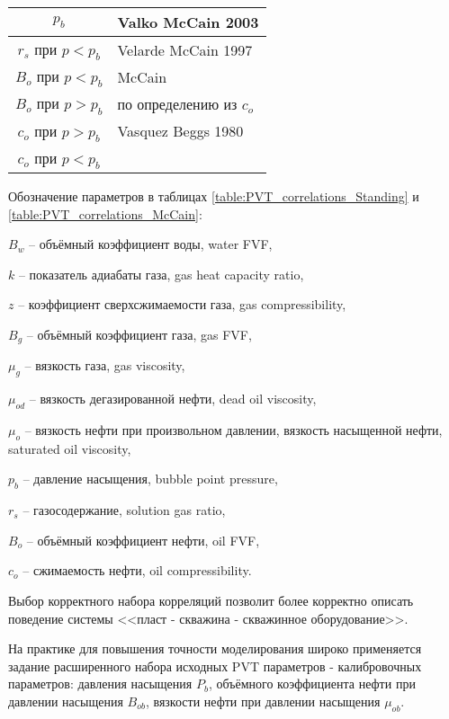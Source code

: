 \begin{table}[]
\begin{tabular}{|c|l|}
		$p_{b}$     &  Valko McCain 2003 \cite{Valko_McCain_2003}    \\ \hline
		
		$r_{s}$ при $p<p_b$      &   Velarde McCain 1997 \cite{Velarde_McCain_1997}    \\ \hline
		
		$B_o$ при $p<p_b$   &  McCain  \cite{McCain_1990}       \\ \hline
		
		$B_o$ при $p>p_b$   &  по определению из $c_o$        \\ \hline
		
		$c_o$ при $p>p_b$   &   Vasquez Beggs 1980 \cite{Vazquez_Beggs_1980, petrowiki_oil_system_correlations, petrowiki_oil_viscosity_app_A_11_1, Yukos_PVT_2002}        \\ \hline
		
		$c_o$ при $p<p_b$  &          \\ \hline
	\end{tabular}
\end{table}


Обозначение параметров в таблицах \ref{table:PVT_correlations_Standing} и \ref{table:PVT_correlations_McCain}:

$B_w$ -- объёмный коэффициент воды, water FVF,

$k$ -- показатель адиабаты газа, gas heat capacity ratio,

$z$ -- коэффициент сверхсжимаемости газа, gas compressibility,

$B_g$ -- объёмный коэффициент газа, gas FVF,

$\mu_g$ -- вязкость газа, gas viscosity,

$\mu_{od}$  -- вязкость дегазированной нефти, dead oil viscosity,

$\mu_{o}$  -- вязкость нефти при произвольном давлении, вязкость насыщенной нефти, saturated oil viscosity,

$p_{b}$ -- давление насыщения, bubble point pressure, 

$r_{s}$ -- газосодержание, solution gas ratio, 

$B_o$ -- объёмный коэффициент нефти, oil FVF, 

$c_o$ -- сжимаемость нефти, oil compressibility.

Выбор корректного набора корреляций позволит более корректно описать поведение системы <<пласт - скважина - скважинное оборудование>>. 

На практике для повышения точности моделирования широко применяется задание расширенного набора исходных PVT параметров - калибровочных параметров: давления насыщения $P_b$, объёмного коэффициента нефти при давлении насыщения $B_{ob}$, вязкости нефти при давлении насыщения $\mu_{ob}$. 

